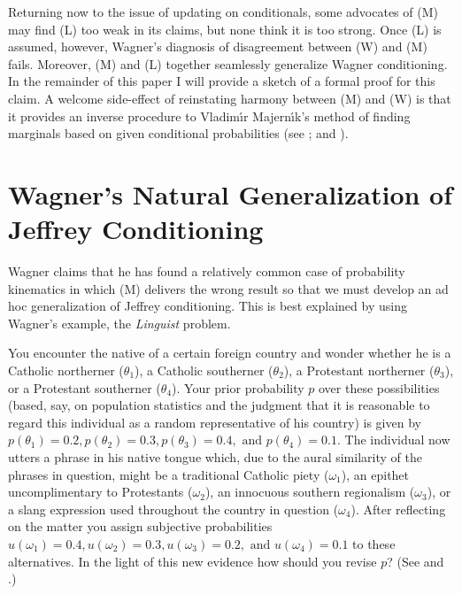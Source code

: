 Returning now to the issue of updating on conditionals, some advocates
of (M) may find (L) too weak in its claims, but none think it is too
strong. Once (L) is assumed, however, Wagner's diagnosis of
disagreement between (W) and (M) fails. Moreover, (M) and (L) together
seamlessly generalize Wagner conditioning. In the remainder of this
paper I will provide a sketch of a formal proof for this claim. A
welcome side-effect of reinstating harmony between (M) and (W) is that
it provides an inverse procedure to Vladim{\'\i}r Majern{\'\i}k's
method of finding marginals based on given conditional probabilities
(see ; and ).

\section{Wagner's Natural Generalization of Jeffrey Conditioning}
\label{NatGen}

Wagner claims that he has found a relatively common case of
probability kinematics in which (M) delivers the wrong result so that
we must develop an ad hoc generalization of Jeffrey conditioning. This
is best explained by using Wagner's example, the \emph{Linguist}
problem.

\begin{quotex}
  You encounter the native of a certain foreign country and wonder
  whether he is a Catholic northerner ($\theta_{1}$), a Catholic
  southerner ($\theta_{2}$), a Protestant northerner ($\theta_{3}$),
  or a Protestant southerner ($\theta_{4}$). Your prior probability
  $p$ over these possibilities (based, say, on population statistics
  and the judgment that it is reasonable to regard this individual as
  a random representative of his country) is given by
  $p(\theta_{1})=0.2,p(\theta_{2})=0.3,p(\theta_{3})=0.4,\mbox{ and
  }p(\theta_{4})=0.1$. The individual now utters a phrase in his
  native tongue which, due to the aural similarity of the phrases in
  question, might be a traditional Catholic piety ($\omega_{1}$), an
  epithet uncomplimentary to Protestants ($\omega_{2}$), an innocuous
  southern regionalism ($\omega_{3}$), or a slang expression used
  throughout the country in question ($\omega_{4}$). After reflecting
  on the matter you assign subjective probabilities
  $u(\omega_{1})=0.4,u(\omega_{2})=0.3,u(\omega_{3})=0.2,\mbox{ and
  }u(\omega_{4})=0.1$ to these alternatives. In the light of this new
  evidence how should you revise $p$? (See 
  and .)
\end{quotex}

